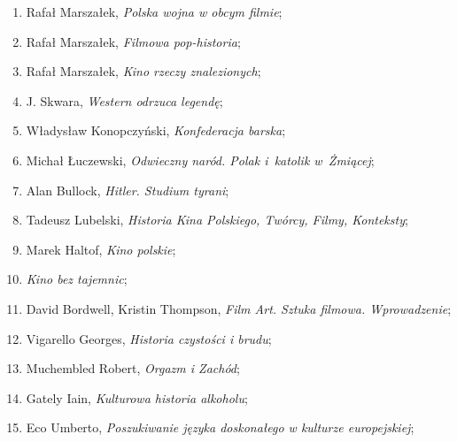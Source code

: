 \documentclass[a4paper,11pt]{article}
\begin{document}
\begin{enumerate}
\item Rafał Marszałek, \textit{Polska wojna w obcym filmie};



\item Rafał Marszałek, \textit{Filmowa pop-historia};



\item Rafał Marszałek, \textit{Kino rzeczy znalezionych};



\item J. Skwara, \textit{Western odrzuca legendę};



\item Władysław Konopczyński, \textit{Konfederacja barska};



\item Michał Łuczewski, \textit{Odwieczny naród. Polak i~katolik
    w~Żmiącej};



\item Alan Bullock, \textit{Hitler. Studium tyrani};



\item Tadeusz Lubelski, \textit{Historia Kina Polskiego, Twórcy, Filmy,
    Konteksty};



\item Marek Haltof, \textit{Kino polskie};



\item \textit{Kino bez tajemnic};



\item David Bordwell, Kristin Thompson, \textit{Film Art. Sztuka
    filmowa. Wprowadzenie};



\item Vigarello Georges, \textit{Historia czystości i brudu};



\item Muchembled Robert, \textit{Orgazm i Zachód};



\item Gately Iain, \textit{Kulturowa historia alkoholu};



\item Eco Umberto, \textit{Poszukiwanie języka doskonałego w kulturze
    europejskiej};




\end{enumerate}
\end{document}
